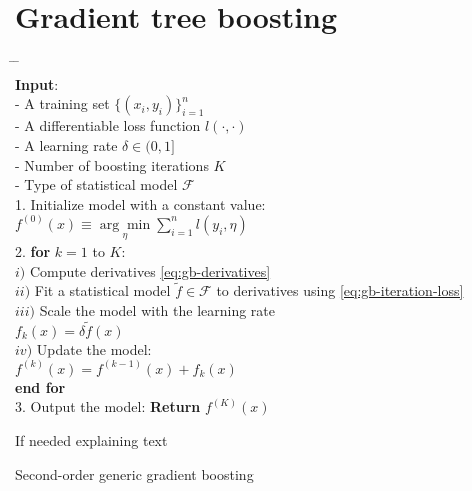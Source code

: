 \section{Gradient tree boosting}
\label{sec:gradient tree boosting}
\begin{algorithm*}[h!]
	\begin{tabbing}
		\hspace{2em} \= \hspace{2em} \= \hspace{2em} \= \\
		{\bfseries Input}: \\
		\> - A training set $\{(x_i, y_{i})\}_{i=1}^n$\\
		\> - A differentiable loss function $l(\cdot,\cdot)$\\
		\> - A learning rate $\delta\in(0,1]$\\
		\> - Number of boosting iterations $K$\\
		\> - Type of statistical model $\mathcal{F}$\\
		
		1. Initialize model with a constant value:\\
		\>	$f^{(0)}(x) \equiv \underset{\eta}{\arg\min} \sum_{i=1}^n l(y_i, \eta)$\\
		
		2. {\bfseries for} $k = 1$ to $K$:\\
		
		\>	$i)$ Compute derivatives \eqref{eq:gb-derivatives}\\
		
		\> $ii)$ Fit a statistical model $\tilde{f}\in \mathcal{F}$ to derivatives using \eqref{eq:gb-iteration-loss} \\
		
		\> $iii)$ Scale the model with the learning rate\\
		\>\> $f_k(x)= \delta \tilde{f}(x)$ \\%
		
		\>	$iv)$ Update the model:\\
		\>\>	$f^{(k)}(x) = f^{(k-1)}(x) + f_k(x)$\\
		{\bfseries end for} \\
		
		3. Output the model: {\bfseries Return} $f^{(K)}(x)$%
		
	\end{tabbing}
	
	\vspace{0.5cm}
	If needed explaining text
	\vspace{0.5cm}
	
	\caption{\label{alg:gradient-boosting} Second-order generic gradient boosting \cite{friedman2001elements} }
\end{algorithm*}

